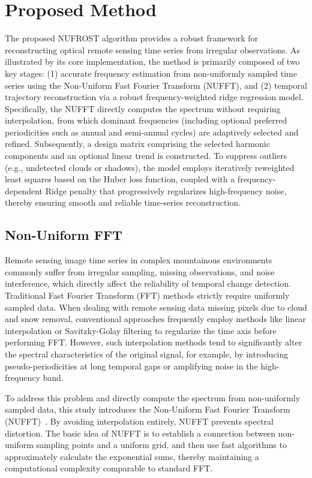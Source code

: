 \documentclass[letterpaper,journal]{IEEEtran}
\begin{document}
\section{Proposed Method}
The proposed NUFROST algorithm provides a robust framework for reconstructing optical remote sensing time series from irregular observations. As illustrated by its core implementation, the method is primarily composed of two key stages: (1) accurate frequency estimation from non-uniformly sampled time series using the Non-Uniform Fast Fourier Transform (NUFFT), and (2) temporal trajectory reconstruction via a robust frequency-weighted ridge regression model. Specifically, the NUFFT directly computes the spectrum without requiring interpolation, from which dominant frequencies (including optional preferred periodicities such as annual and semi-annual cycles) are adaptively selected and refined. Subsequently, a design matrix comprising the selected harmonic components and an optional linear trend is constructed. To suppress outliers (e.g., undetected clouds or shadows), the model employs iteratively reweighted least squares based on the Huber loss function, coupled with a frequency-dependent Ridge penalty that progressively regularizes high-frequency noise, thereby ensuring smooth and reliable time-series reconstruction.

\subsection{Non-Uniform FFT}

Remote sensing image time series in complex mountainous environments commonly suffer from irregular sampling, missing observations, and noise interference, which directly affect the reliability of temporal change detection. Traditional Fast Fourier Transform (FFT) methods strictly require uniformly sampled data. When dealing with remote sensing data missing pixels due to cloud and snow removal, conventional approaches frequently employ methods like linear interpolation or Savitzky-Golay filtering to regularize the time axis before performing FFT. However, such interpolation methods tend to significantly alter the spectral characteristics of the original signal, for example, by introducing pseudo-periodicities at long temporal gaps or amplifying noise in the high-frequency band.

To address this problem and directly compute the spectrum from non-uniformly sampled data, this study introduces the Non-Uniform Fast Fourier Transform (NUFFT)~\cite{ref4,ref6}. By avoiding interpolation entirely, NUFFT prevents spectral distortion. The basic idea of NUFFT is to establish a connection between non-uniform sampling points and a uniform grid, and then use fast algorithms to approximately calculate the exponential sums, thereby maintaining a computational complexity comparable to standard FFT.
\end{document}
